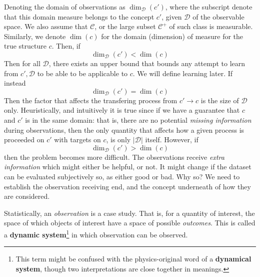 \documentclass{article}
\begin{document}
Denoting the domain of observations as $\dim_{\mathcal{D}}{(c')}$, where the subscript denote that this domain measure belongs to the concept $c'$, given $\mathcal{D}$ of the observable space. We also assume that $\mathcal{C}$, or the large subset $\mathcal{C}^{+}$ of such class is measurable. Similarly, we denote $\dim{(c)}$ for the domain (dimension) of measure for the true structure $c$. Then, if \begin{equation}
    \dim_{\mathcal{D}}{(c')} < \dim{(c)}
\end{equation}
Then for all $\mathcal{D}$, there exists an upper bound that bounds any attempt to learn from $c',\mathcal{D}$ to be able to be applicable to $c$. We will define learning later. If instead 
\begin{equation}
    \dim_{\mathcal{D}}{(c')} = \dim{(c)}
\end{equation}
Then the factor that affects the transfering process from $c'\to c$ is the size of $\mathcal{D}$ only. Heuristically, and intuitively it is true since if we have a guarantee that $c$ and $c'$ is in the same domain: that is, there are no potential \textit{missing information} during observations, then the only quantity that affects how a given process is proceeded on $c'$ with targets on $c$, is only $\lvert\mathcal{D}\rvert$ itself. 
However, if 
\begin{equation}
    \dim_{\mathcal{D}}{(c')} > \dim{(c)}
\end{equation}
then the problem becomes more difficult. The observations receive \textit{extra information} which might either be helpful, or not. It might change if the dataset can be evaluated subjectively so, as either good or bad. Why so? We need to establish the observation receiving end, and the concept underneath of how they are considered. 

Statistically, an \textit{observation} is a case study. That is, for a quantity of interest, the space of which objects of interest have a space of possible \textit{outcomes}. This is called a \textbf{dynamic system}\footnote{This term might be confused with the physics-original word of a \textbf{dynamical system}, though two interpretations are close together in meanings.} in which observation can be observed. 
\end{document}
